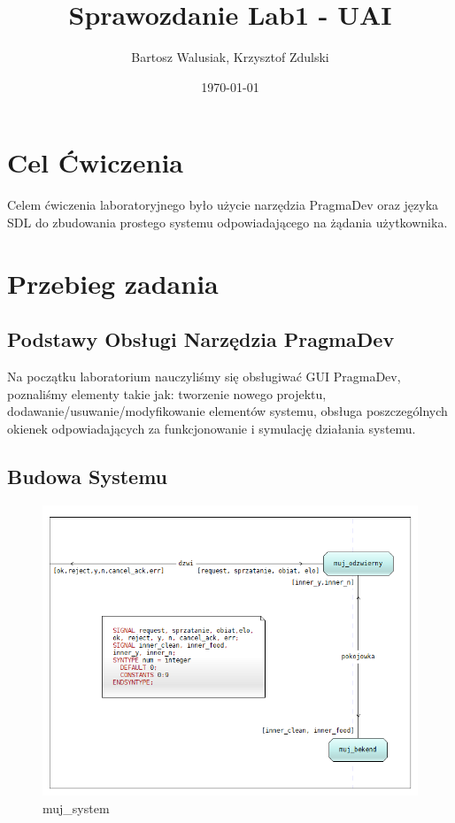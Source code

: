 \documentclass[a4paper,12pt]{article}
\begin{document}
    \title{Sprawozdanie Lab1 - UAI}
    \author{Bartosz Walusiak, Krzysztof Zdulski}
    \date{\today}
    \maketitle

    \tableofcontents
    \newpage

    \section{Cel Ćwiczenia}\label{sec:cel-ćwiczenia}

    Celem ćwiczenia laboratoryjnego było użycie narzędzia PragmaDev oraz języka SDL do zbudowania prostego systemu
    odpowiadającego na żądania użytkownika.


    \section{Przebieg zadania}\label{sec:przebieg-zadania}

    \subsection{Podstawy Obsługi Narzędzia PragmaDev}\label{subsec:podstawy-obsługi-narzędzia-pragnadev}

    Na początku laboratorium nauczyliśmy się obsługiwać GUI PragmaDev, poznaliśmy elementy takie jak: tworzenie nowego
    projektu, dodawanie/usuwanie/modyfikowanie elementów systemu, obsługa poszczególnych okienek odpowiadających za
    funkcjonowanie i symulację działania systemu.

    \subsection{Budowa Systemu}\label{subsec:budowa-systemu}

    \begin{figure}[H]
        \centering
        \includegraphics[width=1\textwidth]{images/system.png}
        \caption{muj\_system}
    \end{figure}
\end{document}
